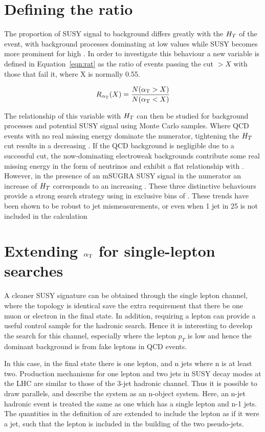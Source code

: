 \section{Defining the ratio \RaT}
\label{sec:atrat}

The proportion of SUSY signal to background differs greatly with the $H_{T} $ of the event, with background processes dominating at low values while SUSY becomes more prominent for high \HT. In order to investigate this behaviour a new variable \RaT is defined in Equation~\ref{eqn:rat} as the ratio of events passing the cut \alt $> X$ with those that fail it, where X is normally 0.55. 

\begin{equation}
R_{\alpha_{\text{T}}}(X) = \frac{N(\alpha_{\text{T}} > X)}{N(\alpha_{\text{T}} < X)}
\label{eqn:rat}
\end{equation}

The relationship of this variable with $H_{T} $ can then be studied for background processes and potential SUSY signal using Monte Carlo samples. Where QCD events with no real missing energy dominate the numerator, tightening the $H_{T} $ cut results in a decreasing \RaT. If the QCD background is negligible due to a successful \alt cut, the now-dominating  electroweak backgrounds contribute some real missing energy in the form of neutrinos and exhibit a flat relationship with \HT. However, in the presence of an mSUGRA SUSY signal in the numerator an increase of $H_{T} $ corresponds to an increasing \RaT. These three distinctive behaviours provide a strong search strategy using \RaT in exclusive bins of \HT. These trends have been shown to be robust to jet mismeasurements, or even when 1 jet in 25 is not included in the calculation~\cite{an2010_119}



\section{Extending $\alpha_{\text{T}}$ for single-lepton searches}
\label{sec:lalt}
A cleaner SUSY signature can be obtained through the single lepton channel, where the topology is identical save the extra requirement that there be one muon or electron in the final state. In addition, requiring a lepton can provide a useful control sample for the hadronic search. Hence it is interesting to develop the \alt search for this channel, especially where the lepton $p_{T}$ is low and hence the dominant background is from fake leptons in QCD events. 

In this case, in the final state there is one lepton, and n jets where n is at least two. Production mechanisms for one lepton and two jets in SUSY decay modes at the LHC are similar to those of the 3-jet hadronic channel. Thus it is possible to draw parallels, and describe the system as an n-object system. Here, an n-jet hadronic event is treated the same as one which has a single lepton and n-1 jets.  The quantities in the definition of \alt are extended to include the lepton as if it were a jet, such that the lepton is included in the building of the two pseudo-jets. 


